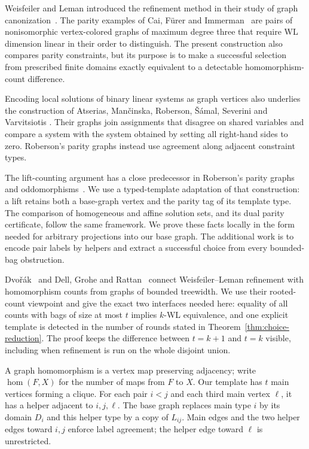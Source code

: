 Weisfeiler and Leman introduced the refinement method in their study
of graph canonization~\citep{WL1968}. The parity examples of
Cai, F\"urer and Immerman~\citep{CFI1992} are pairs of nonisomorphic
vertex-colored graphs of maximum degree three that require WL dimension
linear in their order to distinguish. The present construction also compares
parity constraints, but its purpose is to make a successful selection
from prescribed finite domains exactly equivalent to a detectable
homomorphism-count difference.

Encoding local solutions of binary linear systems as graph vertices
also underlies the construction of Atserias, Man\v{c}inska, Roberson,
\v{S}\'amal, Severini and Varvitsiotis
\citep[author version, Section~6.2]{AMRSSV2019}.
Their graphs join assignments that disagree on shared variables and
compare a system with the system obtained by setting all right-hand
sides to zero. Roberson's parity graphs instead use agreement along
adjacent constraint types.

The lift-counting argument has a close predecessor in Roberson's parity
graphs and oddomorphisms~\citep[preprint version, Definition~3.1,
Theorem~3.6 and Lemma~3.8]{Roberson2026}. We use a typed-template adaptation of that
construction: a lift retains both a base-graph vertex and the parity
tag of its template type. The comparison of homogeneous and affine
solution sets, and its dual parity certificate, follow the same
framework. We prove these facts locally in the form needed for arbitrary
projections into our base graph. The additional work is to encode pair
labels by helpers and extract a successful choice from every
bounded-bag obstruction.

Dvo\v{r}\'ak~\citep{Dvorak2010} and Dell, Grohe and
Rattan~\citep{DGR2018} connect Weisfeiler--Leman refinement with
homomorphism counts from graphs of bounded treewidth. We use their
rooted-count viewpoint and give the exact two interfaces needed here:
equality of all counts with bags of size at most \(t\) implies
\(k\)-WL equivalence, and one explicit template is detected in the
number of rounds stated in Theorem~\ref{thm:choice-reduction}.
The proof keeps the difference between \(t=k+1\) and \(t=k\) visible,
including when refinement is run on the whole disjoint union.

A graph homomorphism is a vertex map preserving adjacency; write
\(\hom(F,X)\) for the number of maps from \(F\) to \(X\).
Our template has \(t\) main vertices forming a clique. For each pair
\(i<j\) and each third main vertex \(\ell\), it has a helper adjacent
to \(i,j,\ell\). The base graph replaces main type \(i\) by its domain
\(D_i\) and this helper type by a copy of \(L_{ij}\). Main edges and the
two helper edges toward \(i,j\) enforce label agreement; the helper
edge toward \(\ell\) is unrestricted.

